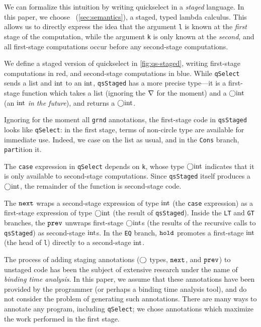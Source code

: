 \begin{abstrsyn}
We can formalize this intuition by writing quickselect in a \emph{staged}
language. In this paper, we choose \lang\ (\ref{sec:semantics}), a staged, typed
lambda calculus. This allows us to directly express the idea that the argument
\texttt{l} is known at the \emph{first} stage of the computation, while the
argument \texttt{k} is only known at the \emph{second}, and all
first-stage computations occur before any second-stage computations.

We define a staged version of quickselect in \ref{fig:qs-staged}, writing
first-stage computations in red, and second-stage computations in blue. While
\texttt{qSelect} sends a \textrm{list} and ${\rm int}$ to an ${\rm int}$,
\texttt{qsStaged} has a more precise type---it is a first-stage function which
takes a \textrm{list} (ignoring the $\nabla$ for the moment) and a $\bigcirc{\rm int}$
(an ${\rm int}$ \emph{in the future}), and returns a $\bigcirc{\rm int}$.

Ignoring for the moment all \texttt{grnd} annotations, the first-stage code in
\texttt{qsStaged} looks like \texttt{qSelect}: in the first stage, terms of
non-circle type are available for immediate use. Indeed, we case on the list as
usual, and in the \texttt{Cons} branch, \texttt{part}ition it.

The \texttt{case} expression in \texttt{qSelect} depends on \texttt{k}, whose
type $\bigcirc{\rm int}$ indicates that it is only available to second-stage
computations. Since \texttt{qsStaged} itself produces a $\bigcirc{\rm int}$, the
remainder of the function is second-stage code.

The ${\tt next}$ wraps a second-stage expression of type ${\rm int}$ (the \texttt{case}
expression) as a first-stage expression of type $\bigcirc{\rm int}$ (the result 
of \texttt{qsStaged}). Inside the \texttt{LT} and \texttt{GT} branches, the
${\tt prev}$ unwraps first-stage $\bigcirc{\rm int}$s (the results of the recursive calls
to \texttt{qsStaged}) as second-stage ${\rm int}$s. In the \texttt{EQ} branch,
${\tt hold}$ promotes a first-stage ${\rm int}$ (the head of \texttt{l}) directly to a
second-stage ${\rm int}$.

The process of adding staging annotations ($\bigcirc$ types, ${\tt next}$, and ${\tt prev}$)
to unstaged code has been the subject of extensive research under the
name of \emph{binding time analysis}. In this paper, we assume that these
annotations have been provided by the programmer (or perhaps a binding time
analysis tool), and do not consider the problem of generating such annotations.
There are many ways to annotate any program, including \texttt{qSelect}; we
chose annotations which maximize the work performed in the first stage.


\end{abstrsyn}
